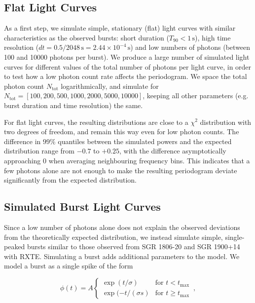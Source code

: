 \documentclass[numberedappendix]{emulateapj}
\begin{document}
\subsection{Flat Light Curves}
\label{sec:analysis_lcsims}
As a first step, we simulate simple, stationary (flat) light curves with similar characteristics as the observed bursts: short duration ($T_{90} < 1 \, \mathrm{s}$), high time resolution ($dt = 0.5/2048 \, \mathrm{s} = 2.44\times 10^{-4} \, \mathrm{s}$) and low numbers of photons (between 100 and 10000 photons per burst). 
We produce a large number of simulated light curves for different values of the total number of photons per light curve, in order to test how a low photon count rate affects the periodogram. We space the total photon count $N_{\mathrm{tot}}$ logarithmically, and simulate for $N_{\mathrm{tot}} = [100, 200, 500, 1000, 2000, 5000, 10000]$, keeping all other parameters (e.g. burst duration and time resolution) the same.


For flat light curves, the resulting distributions are close to a $\chi^2$ distribution with two degrees of freedom, and remain this way even for low photon counts. The difference in $99\%$ quantiles between the simulated powers and the expected distribution range from $-0.7$ to $+0.25$, with the difference asymptotically approaching $0$ when averaging neighbouring frequency bins.
This indicates that a few photons alone are not enough to make the resulting periodogram deviate significantly from the expected distribution.



\subsection{Simulated Burst Light Curves}
\label{sec:weakburstsims}





Since a low number of photons alone does not explain the observed deviations from the theoretically expected distribution, we instead simulate simple, single-peaked bursts similar to those observed from SGR 1806-20 and SGR 1900+14 with RXTE.
Simulating a burst adds additional parameters to the model. We model a burst as a single spike of the form

\begin{equation}
\phi(t) = A \left\{\begin{array}{ll}\exp(t/\sigma) & \mbox{for $t<t_\mathrm{max}$}\\ \exp(-t/(\sigma s) & \mbox{for $t\geq t_{\mathrm{max}}$}\end{array}\right. \, ,
\label{eqn:spikemodel}
\end{equation}
\end{document}
